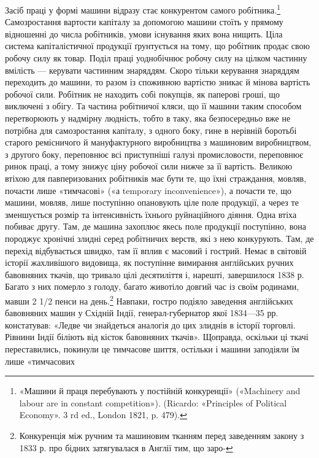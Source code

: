 Засіб праці у формі машини відразу стає конкурентом самого
робітника.\footnote{
«Машини й праця перебувають у постійній конкуренції» («Machinery
and labour are in constant competition»). (Ricardo: «Principles of
Political Economy». 3 rd ed., London 1821, p. 479).
} Самозростання вартости капіталу за допомогою
машини стоїть у прямому відношенні до числа робітників, умови
існування яких вона нищить. Ціла система капіталістичної продукції
ґрунтується на тому, що робітник продає свою робочу силу
як товар. Поділ праці уоднобічнює робочу силу на цілком частинну
вмілість — керувати частинним знаряддям. Скоро тільки
керування знаряддям переходить до машини, то разом із споживною
вартістю зникає й мінова вартість робочої сили. Робітник не
находить собі покупців, як паперові гроші, що виключені з обігу.
Та частина робітничої кляси, що її машини таким способом перетворюють
у надмірну людність, тобто в таку, яка безпосередньо
вже не потрібна для самозростання капіталу, з одного боку, гине
в нерівній боротьбі старого ремісничого й мануфактурного виробництва
з машиновим виробництвом, з другого боку, переповнює
всі приступніші галузі промисловости, переповнює ринок праці,
а тому знижує ціну робочої сили нижче за її вартість. Великою
втіхою для павперизованих робітників має бути те, що їхні страждання,
мовляв, почасти лише «тимчасові» («а temporary inconvenience»),
а почасти те, що машини, мовляв, лише поступінно
опановують ціле поле продукції, а через те зменшується розмір
та інтенсивність їхнього руйнаційного діяння. Одна втіха побиває
другу. Там, де машина захоплює якесь поле продукції поступінно,
вона породжує хронічні злидні серед робітничих верств, які з
нею конкурують. Там, де перехід відбувається швидко, там її
 вплив є масовий і гострий. Немає в світовій історії жахливішого
видовища, як поступінне вимирання англійських ручних бавовняних
ткачів, що тривало цілі десятиліття і, нарешті, завершилося
1838 р. Багато з них померло з голоду, багато животіло довгий
час із своїм родинами, мавши 2 1/2 пенси на день.\footnote{
Конкуренція між ручним та машиновим тканням перед заведенням
закону з 1833 р. про бідних затягувалася в Англії тим, що заро-
} Навпаки,
гостро подіяло заведення англійських бавовняних машин у
Східній Індії, генерал-губернатор якої 1834—35 рр. констатував:
«Ледве чи знайдеться аналогія до цих злиднів в історії
торговлі. Рівнини Індії біліють від кісток бавовняних ткачів».
Щоправда, оскільки ці ткачі переставились, покинули це тимчасове
шиття, остільки і машини заподіяли їм лише «тимчасових
